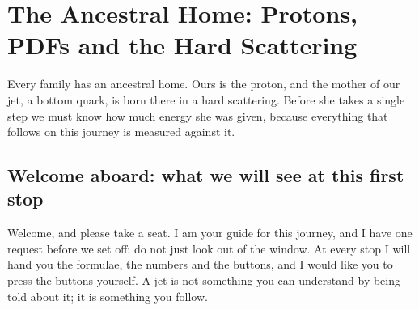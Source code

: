 \chapter{The Ancestral Home: Protons, PDFs and the Hard Scattering}
\label{ch:ancestral_home}

\begin{journeybox}
Every family has an ancestral home. Ours is the proton, and the mother of our
jet, a bottom quark, is born there in a hard scattering. Before she takes a
single step we must know how much energy she was given, because everything
that follows on this journey is measured against it.
\end{journeybox}


\section{Welcome aboard: what we will see at this first stop}
\label{sec:ancestral_home:what_we_compute}

Welcome, and please take a seat. I am your guide for this journey, and I have
one request before we set off: do not just look out of the window. At every
stop I will hand you the formulae, the numbers and the buttons, and I would
like you to press the buttons yourself. A jet is not something you can
understand by being told about it; it is something you follow.

